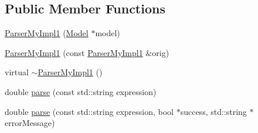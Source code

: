 \subsection*{Public Member Functions}
\begin{DoxyCompactItemize}
\item 
\hyperlink{class_parser_my_impl1_a09612c2d483378a394d98b79b2d286d9}{Parser\-My\-Impl1} (\hyperlink{class_model}{Model} $\ast$model)
\item 
\hyperlink{class_parser_my_impl1_ad59c32deaf5b413ce531d76dccd748d4}{Parser\-My\-Impl1} (const \hyperlink{class_parser_my_impl1}{Parser\-My\-Impl1} \&orig)
\item 
virtual \hyperlink{class_parser_my_impl1_a66c1b7f8305dc7d7f0f5000f771e9b99}{$\sim$\-Parser\-My\-Impl1} ()
\item 
double \hyperlink{class_parser_my_impl1_aacc6dcad2235633f216088cb78a10554}{parse} (const std\-::string expression)
\item 
double \hyperlink{class_parser_my_impl1_a16e3fabb410b9b7aa73050e25a89c49b}{parse} (const std\-::string expression, bool $\ast$success, std\-::string $\ast$error\-Message)
\end{DoxyCompactItemize}


